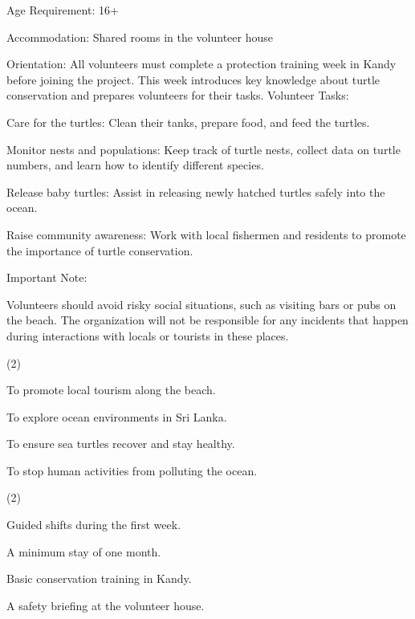 \documentclass{英语试卷}
\begin{document}
\par Age Requirement: 16+\par
\par Accommodation: Shared rooms in the volunteer house\par
\par Orientation: All volunteers must complete a protection training week in Kandy before joining the project. This week introduces key knowledge about turtle conservation and prepares volunteers for their tasks. Volunteer Tasks:\par
\par Care for the turtles: Clean their tanks, prepare food, and feed the turtles.\par
\par Monitor nests and populations: Keep track of turtle nests, collect data on turtle numbers, and learn how to identify different species.\par
\par Release baby turtles: Assist in releasing newly hatched turtles safely into the ocean.\par
\par Raise community awareness: Work with local fishermen and residents to promote the importance of turtle conservation.\par
\par Important Note:\par
\par Volunteers should avoid risky social situations, such as visiting bars or pubs on the beach. The organization will not be responsible for any incidents that happen during interactions with locals or tourists in these places.\par
{}
\begin{choices}(2)
  \item To promote local tourism along the beach.
  \item To explore ocean environments in Sri Lanka.
  \item To ensure sea turtles recover and stay healthy.
  \item To stop human activities from polluting the ocean.
\end{choices}
\begin{choices}(2)
  \item Guided shifts during the first week.
  \item A minimum stay of one month.
  \item Basic conservation training in Kandy.
  \item A safety briefing at the volunteer house.
\end{choices}
\end{document}
